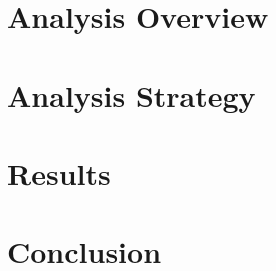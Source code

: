 \documentclass{brandeis-dissertation3.14}
\begin{document}
\chapter{Analysis Overview}
\label{chap:ana_overview}


\chapter{Analysis Strategy}
\label{chap:ana_strategy}


\chapter{Results}
\label{chap:results}


\chapter{Conclusion}
\label{chap:conclusion}


\printbibliography
\end{document}
